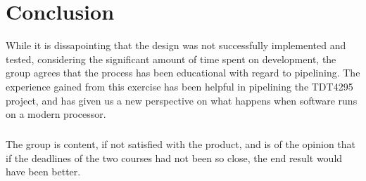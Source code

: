 \chapter{Conclusion}
While it is dissapointing that the design was not successfully implemented and
tested, considering the significant amount of time spent on development, the 
group agrees that the process has been educational with regard to pipelining.
The experience gained from this exercise has been helpful in pipelining the 
TDT4295 project, and has given us a new perspective on what happens when 
software runs on a modern processor.
\paragraph*{}
The group is content, if not satisfied with the product, and is of the opinion 
that if the deadlines of the two courses had not been so close, the end result
would have been better.
